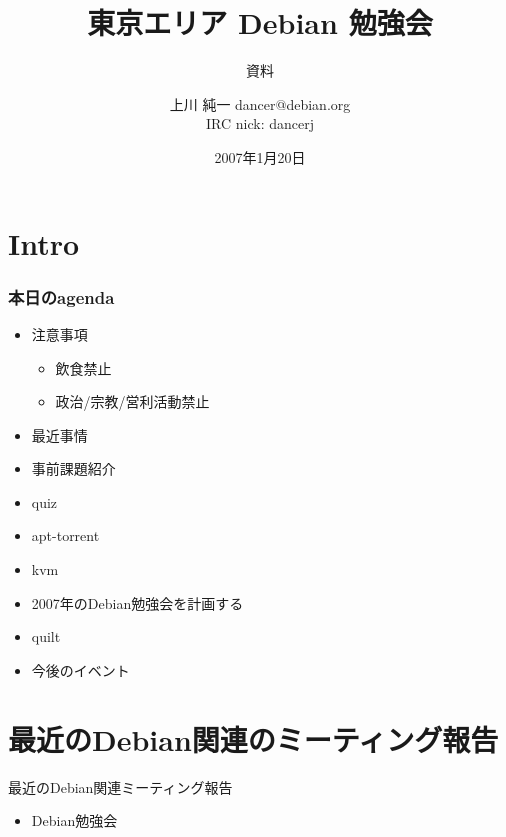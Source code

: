 \documentclass[cjk,dvipdfmx]{beamer}
\title{東京エリア Debian 勉強会}
\subtitle{資料}
\author{上川 純一 dancer@debian.org\\IRC nick: dancerj}
\date{2007年1月20日}
\begin{document}
\frame{\titlepage{}}

\section{Intro}

\begin{frame}
 \frametitle{本日のagenda}
\begin{minipage}[t]{0.4\hsize}
  \begin{itemize}
  \item 注意事項
	\begin{itemize}
	 \item 飲食禁止
	 \item 政治/宗教/営利活動禁止
	\end{itemize}
  \item 最近事情
  \item 事前課題紹介
  \item quiz
 \end{itemize}
\end{minipage} 
\begin{minipage}[t]{0.4\hsize}
 \begin{itemize}
  \item apt-torrent
  \item kvm
  \item 2007年のDebian勉強会を計画する
  \item quilt
  \item 今後のイベント
 \end{itemize}
\end{minipage}
\end{frame}

\section{最近のDebian関連のミーティング報告}

\begin{frame}{最近のDebian関連ミーティング報告}
 \begin{itemize}
  \item Debian勉強会
 \end{itemize}
\end{frame}
\end{document}
